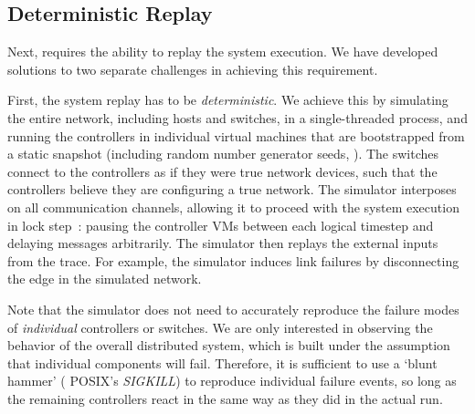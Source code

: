 {



\subsection{Deterministic Replay}

Next, \simulator{} requires the ability to replay the system execution.
We have developed solutions to two separate challenges in achieving this requirement.

First, the system replay has to be {\em deterministic}.
We achieve this by simulating the entire network, including hosts and
switches, in a single-threaded process, and running the controllers in
individual virtual machines that are
bootstrapped from a static snapshot (including random number generator
seeds, \etc{}). The switches connect to the controllers as if they were true
network devices, such that the controllers believe they are configuring a true
network. The simulator interposes on all communication channels,
allowing it to proceed with the system execution in
lock step~\cite{Dunlap:2002:REI:844128.844148}:
pausing the controller VMs between each logical timestep and delaying messages
arbitrarily. The simulator then replays the external inputs from the trace.
For example, the simulator induces link failures by disconnecting the edge in
the simulated network.

Note that the simulator does not need
to accurately reproduce the failure modes of {\em individual} controllers or switches.
We are only interested in observing the behavior of the overall distributed system, which is
built under the assumption that individual components will fail.
Therefore, it is sufficient to use a `blunt hammer' (\eg{} POSIX's {\em SIGKILL}) to reproduce individual
failure events, so long as the remaining controllers react in the same
way as they did in the actual run.

}
